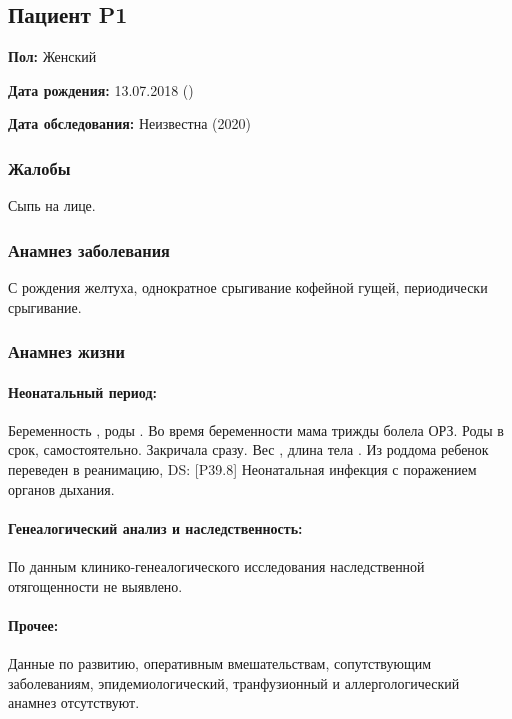 \documentclass[a4paper,14pt]{extarticle}
\newcommand{\gramm}{г}
\newcommand{\cm}{см}
\newcommand{\DS}[2]{[#2] #1}
\begin{document}
\subsection*{Пациент P1}

\textbf{Пол:} Женский

\textbf{Дата рождения:} 13.07.2018 ()

\textbf{Дата обследования:} Неизвестна (2020)

\subsubsection*{Жалобы}

Сыпь на лице.

\subsubsection*{Анамнез заболевания}

С рождения желтуха, однократное срыгивание кофейной гущей, периодически срыгивание.

\subsubsection*{Анамнез жизни}

\paragraph{Неонатальный период:}
Беременность , роды .
Во время беременности мама трижды болела ОРЗ.
Роды в срок, самостоятельно.
Закричала сразу.
Вес \numprint[\gramm]{2940}, длина тела \numprint[\cm]{49}.
Из роддома ребенок переведен в реанимацию, DS: \DS{Неонатальная инфекция с поражением органов дыхания}{P39.8}.

\paragraph{Генеалогический анализ и наследственность:} По данным клинико\hyp{}генеалогического исследования наследственной отягощенности не выявлено.

\paragraph{Прочее:} Данные по развитию, оперативным вмешательствам, сопутствующим заболеваниям, эпидемиологический, транфузионный и аллергологический анамнез отсутствуют.
\end{document}

